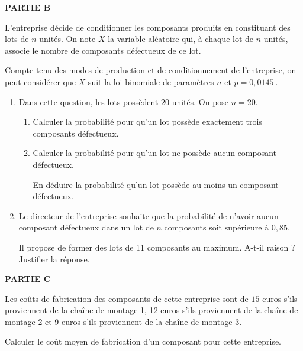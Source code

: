 \documentclass[10pt]{article}
\providecommand{\np}[2][]{{#2~#1}}
\providecommand{\no}{{\text{n°}}}
\begin{document}
\medskip

\textbf{PARTIE B}

\medskip

L'entreprise décide de conditionner les composants produits en constituant des lots de $n$ unités. On note $X$ la variable aléatoire qui, à chaque lot de $n$ unités, associe le nombre de composants défectueux de ce lot. 

Compte tenu des modes de production et de conditionnement de l'entreprise, on peut considérer que $X$ suit la loi binomiale de paramètres $n$ et $p = \np{0,0145}$.

\medskip

\begin{enumerate}
\item Dans cette question, les lots possèdent $20$ unités. On pose $n =20$.
	\begin{enumerate}
		\item Calculer la probabilité pour qu'un lot possède exactement trois composants défectueux.
		\item Calculer la probabilité pour qu'un lot ne possède aucun composant défectueux.
		
En déduire la probabilité qu'un lot possède au moins un composant défectueux.
	\end{enumerate}
\item  Le directeur de l'entreprise souhaite que la probabilité de n'avoir aucun composant
défectueux dans un lot de $n$ composants soit supérieure à $0,85$. 

Il propose de former des lots de 11 composants au maximum. A-t-il raison ? Justifier la réponse.
\end{enumerate}

\medskip

\textbf{PARTIE C}

\medskip

Les coûts de fabrication des composants de cette entreprise sont de $15$ euros s'ils proviennent de la chaîne de montage \no 1, 12 euros s'ils proviennent de la chaîne de montage \no 2 et 9 euros s'ils proviennent de la chaîne de montage \no 3.

Calculer le coût moyen de fabrication d'un composant pour cette entreprise.

\bigskip
\end{document}
